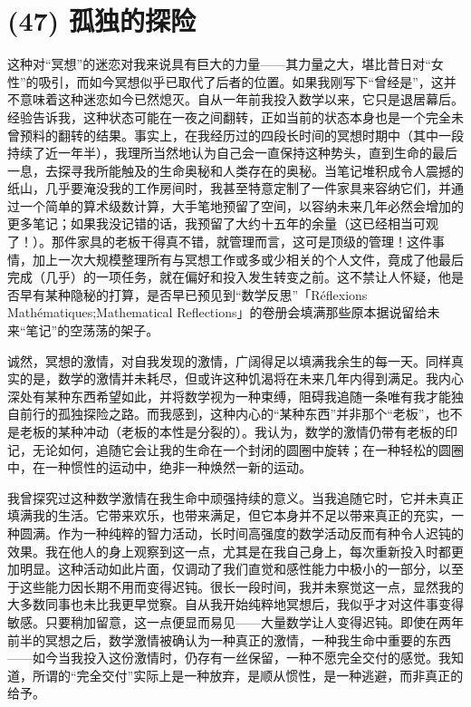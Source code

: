 \section{(47) 孤独的探险}

这种对“冥想”的迷恋对我来说具有巨大的力量——其力量之大，堪比昔日对“女性”的吸引，而如今冥想似乎已取代了后者的位置。如果我刚写下“曾经是”，这并不意味着这种迷恋如今已然熄灭。自从一年前我投入数学以来，它只是退居幕后。经验告诉我，这种状态可能在一夜之间翻转，正如当前的状态本身也是一个完全未曾预料的翻转的结果。事实上，在我经历过的四段长时间的冥想时期中（其中一段持续了近一年半），我理所当然地认为自己会一直保持这种势头，直到生命的最后一息，去探寻我所能触及的生命奥秘和人类存在的奥秘。当笔记堆积成令人震撼的纸山，几乎要淹没我的工作房间时，我甚至特意定制了一件家具来容纳它们，并通过一个简单的算术级数计算，大手笔地预留了空间，以容纳未来几年必然会增加的更多笔记；如果我没记错的话，我预留了大约十五年的余量（这已经相当可观了！）。那件家具的老板干得真不错，就管理而言，这可是顶级的管理！这件事情，加上一次大规模整理所有与冥想工作或多或少相关的个人文件，竟成了他最后完成（几乎）的一项任务，就在偏好和投入发生转变之前。这不禁让人怀疑，他是否早有某种隐秘的打算，是否早已预见到“数学反思”「Réflexions Mathématiques;Mathematical Reflections」的卷册会填满那些原本据说留给未来“笔记”的空荡荡的架子。

诚然，冥想的激情，对自我发现的激情，广阔得足以填满我余生的每一天。同样真实的是，数学的激情并未耗尽，但或许这种饥渴将在未来几年内得到满足。我内心深处有某种东西希望如此，并将数学视为一种束缚，阻碍我追随一条唯有我才能独自前行的孤独探险之路。而我感到，这种内心的“某种东西”并非那个“老板”，也不是老板的某种冲动（老板的本性是分裂的）。我认为，数学的激情仍带有老板的印记，无论如何，追随它会让我的生命在一个封闭的圆圈中旋转；在一种轻松的圆圈中，在一种惯性的运动中，绝非一种焕然一新的运动。

我曾探究过这种数学激情在我生命中顽强持续的意义。当我追随它时，它并未真正填满我的生活。它带来欢乐，也带来满足，但它本身并不足以带来真正的充实，一种圆满。作为一种纯粹的智力活动，长时间高强度的数学活动反而有种令人迟钝的效果。我在他人的身上观察到这一点，尤其是在我自己身上，每次重新投入时都更加明显。这种活动如此片面，仅调动了我们直觉和感性能力中极小的一部分，以至于这些能力因长期不用而变得迟钝。很长一段时间，我并未察觉这一点，显然我的大多数同事也未比我更早觉察。自从我开始纯粹地冥想后，我似乎才对这件事变得敏感。只要稍加留意，这一点便显而易见——大量数学让人变得迟钝。即使在两年前半的冥想之后，数学激情被确认为一种真正的激情，一种我生命中重要的东西——如今当我投入这份激情时，仍存有一丝保留，一种不愿完全交付的感觉。我知道，所谓的“完全交付”实际上是一种放弃，是顺从惯性，是一种逃避，而非真正的给予。

